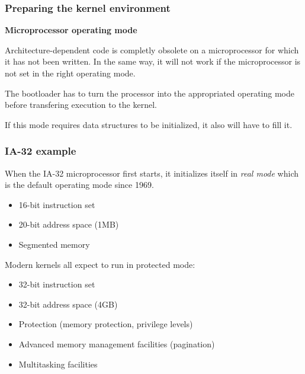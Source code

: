 %
%
%

\begin{frame}
  \frametitle{Preparing the kernel environment}

  {\bf Microprocessor operating mode}

  \-

  Architecture-dependent code is completly obsolete on a microprocessor for which it has not been written. In the same way, it will not work if the microprocessor is not set in the right operating mode.

  \-

  The bootloader has to turn the processor into the appropriated operating mode before transfering execution to the kernel.

  If this mode requires data structures to be initialized, it also will have to fill it.

\end{frame}

%
%
%

\begin{frame}
  \frametitle{IA-32 example}

  When the IA-32 microprocessor first starts, it initializes itself in {\em real mode} which is the default operating mode since 1969.

  \begin{itemize}
  \item 16-bit instruction set
  \item 20-bit address space (1MB)
  \item Segmented memory
  \end{itemize}

  \-

  Modern kernels all expect to run in protected mode:
  \begin{itemize}
  \item 32-bit instruction set
  \item 32-bit address space (4GB)
  \item	Protection (memory protection, privilege levels)
  \item Advanced memory management facilities (pagination)
  \item Multitasking facilities
  \end{itemize}

\end{frame}

%
%
%

